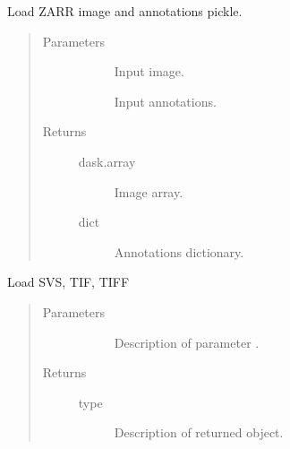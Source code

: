 \documentclass[letterpaper,10pt,english]{sphinxmanual}
\begin{document}
\begin{fulllineitems}
\label{\detokenize{index:pathflowai.utils.load_dataset}}
Load ZARR image and annotations pickle.
\begin{quote}\begin{description}
\item[{Parameters}] \leavevmode\begin{description}
\item[{}] \leavevmode
Input image.

\item[{}] \leavevmode
Input annotations.

\end{description}

\item[{Returns}] \leavevmode\begin{description}
\item[{dask.array}] \leavevmode
Image array.

\item[{dict}] \leavevmode
Annotations dictionary.

\end{description}

\end{description}\end{quote}

\end{fulllineitems}


\begin{fulllineitems}
\label{\detokenize{index:pathflowai.utils.load_image}}
Load SVS, TIF, TIFF
\begin{quote}\begin{description}
\item[{Parameters}] \leavevmode\begin{description}
\item[{}] \leavevmode
Description of parameter .

\end{description}

\item[{Returns}] \leavevmode\begin{description}
\item[{type}] \leavevmode
Description of returned object.

\end{description}

\end{description}\end{quote}

\end{fulllineitems}
\end{document}
